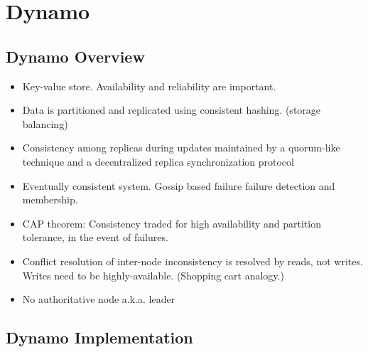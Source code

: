 \documentclass[parskip=half]{scrartcl}
\begin{document}

\newpage

\section{Dynamo} %
\label{sec:dynamo}

    \subsection{Dynamo Overview} %
    \label{sub:dynamo_overview}
    \begin{itemize}
        \item
        Key-value store. Availability and reliability are important.
        \item
        Data is partitioned and replicated using consistent hashing. (storage balancing)
        \item
        Consistency among replicas during updates maintained by a quorum-like technique and a decentralized replica synchronization protocol
        \item
        Eventually consistent system. Gossip based failure failure detection and membership.
        \item
        CAP theorem: Consistency traded for high availability and partition tolerance, in the event of failures.
        \item
        Conflict resolution of inter-node inconsistency is resolved by reads, not writes. Writes need to be highly-available. (Shopping cart analogy.)
        \item
        No authoritative node a.k.a. leader
    \end{itemize}


    \subsection{Dynamo Implementation} %
    \label{sub:dynamo_implementation}
\end{document}
